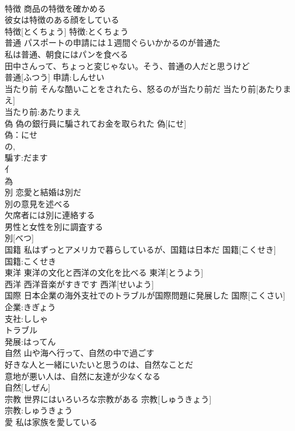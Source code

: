 \documentclass[8pt]{extreport}
\begin{document}
\begin{CJK}{UTF8}{min}
\\	特徴	商品の特徴を確かめる 
\\	彼女は特徴のある顔をしている 
\\	特徴[とくちょう]			特徴:とくちょう
\\	普通	パスポートの申請には１週間ぐらいかかるのが普通た 
\\	私は普通、朝食にはパンを食べる 
\\	田中さんって、ちょっと変じゃない。そう、普通の人だと思うけど 
\\	普通[ふつう]			申請:しんせい
\\	当たり前	そんな酷いことをされたら、怒るのが当たり前だ	当たり前[あたりまえ]	
\\	当たり前:あたりまえ
\\	偽	偽の銀行員に騙されてお金を取られた	偽[にせ]	
\\	偽：にせ
\\	の, 
\\	騙す:だます
\\	亻 
\\	為 
\\	別	恋愛と結婚は別だ 
\\	別の意見を述べる 
\\	欠席者には別に連絡する 
\\	男性と女性を別に調査する 
\\	別[べつ]						
\\	国籍	私はずっとアメリカで暮らしているが、国籍は日本だ	国籍[こくせき]	
\\	国籍:こくせき
\\	東洋	東洋の文化と西洋の文化を比べる	東洋[とうよう]	
\\	西洋	西洋音楽がすきです	西洋[せいよう]	
\\	国際	日本企業の海外支社でのトラブルが国際問題に発展した	国際[こくさい]	
\\	企業:きぎょう
\\	支社:ししゃ
\\	トラブル
\\	発展:はってん
\\	自然	山や海へ行って、自然の中で過ごす 
\\	好きな人と一緒にいたいと思うのは、自然なことだ 
\\	意地が悪い人は、自然に友達が少なくなる 
\\	自然[しぜん]						
\\	宗教	世界にはいろいろな宗教がある	宗教[しゅうきょう]	
\\	宗教:しゅうきょう
\\	愛	私は家族を愛している 

\end{CJK}
\end{document}
